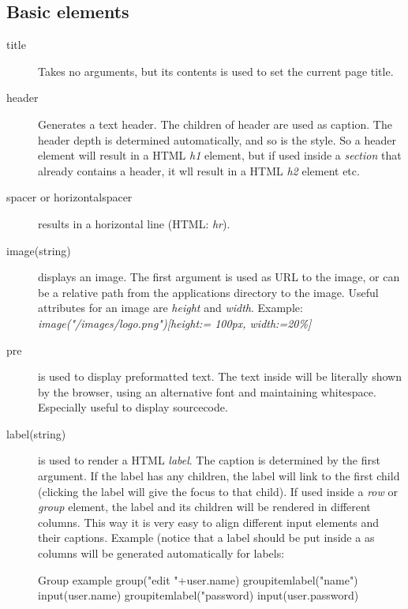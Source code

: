 \subsection{Basic elements}
\begin{description}
	\item[title{}] Takes no arguments, but its contents is used to set the current page title. 
	\item[header{}] Generates a text header. The children of header are used as caption. The header depth is determined automatically, and so is the style. So a header element will result in a HTML \emph{h1} element, but if used inside a \emph{section} that already contains a header, it wll result in a HTML \emph{h2} element etc. 
	\item[spacer or horizontalspacer] results in a horizontal line (HTML: \emph{hr}). 
	\item[image(string)] displays an image. The first argument is used as URL to the image, or can be a relative path from the applications directory to the image. Useful attributes for an image are \emph{height} and \emph{width}. Example: \emph{image("/images/logo.png")[height:= 100px, width:=20\%]}
	\item[pre{}] is used to display preformatted text. The text inside will be literally shown by the browser, using an alternative font and maintaining whitespace. Especially useful to display sourcecode. 
	\item[label(string){}] is used to render a HTML \emph{label}. The caption is determined by the first argument. If the label has any children, the label will link to the first child (clicking the label will give the focus to that child). If used inside a \emph{row} or \emph{group} element, the label and its children will be rendered in different columns. This way it is very easy to align different input elements and their captions. Example (notice that a label should  be put inside a  as columns will be generated automatically for labels:
\begin{webdsl}{Group example}
group("edit "+user.name) {
	groupitem{label("name") 		{ input(user.name)} }
	groupitem{label("password) 	{ input(user.password) } }
}
\end{webdsl}
\end{description}


